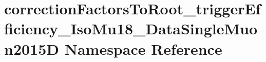 \hypertarget{namespacecorrectionFactorsToRoot__triggerEfficiency__IsoMu18__DataSingleMuon2015D}{
\section{correctionFactorsToRoot\_\-triggerEfficiency\_\-IsoMu18\_\-DataSingleMuon2015D Namespace Reference}
\label{namespacecorrectionFactorsToRoot__triggerEfficiency__IsoMu18__DataSingleMuon2015D}
}
